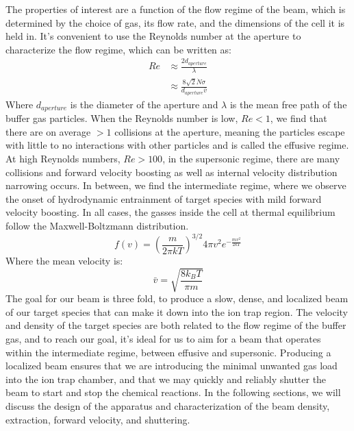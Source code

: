 The properties of interest are a function of the flow regime of the beam, which is determined by the choice of gas, its flow rate, and the dimensions of the cell it is held in. It's convenient to use the Reynolds number at the aperture to characterize the flow regime, which can be written as:
\begin{align}
	Re & \approx \frac{2 d_{aperture}}{\lambda} \nonumber \\
	& \approx \frac{8\sqrt{2} \dot{N} \sigma}{d_{aperture} \bar{v}} \label{eq: reynolds}
\end{align}
Where $d_{aperture}$ is the diameter of the aperture and $\lambda$ is the mean free path of the buffer gas particles.\cite{Hutzler2012} When the Reynolds number is low, $Re<1$, we find that there are on average $>1$ collisions at the aperture, meaning the particles escape with little to no interactions with other particles and is called the effusive regime. At high Reynolds numbers, $Re>100$, in the supersonic regime, there are many collisions and forward velocity boosting as well as internal velocity distribution narrowing occurs. In between, we find the intermediate regime, where we observe the onset of hydrodynamic entrainment of target species with mild forward velocity boosting. In all cases, the gasses inside the cell at thermal equilibrium follow the Maxwell-Boltzmann distribution.
\begin{equation}
	f(v) = \left(\frac{m}{2 \pi k T}\right)^{3/2}4 \pi v^2 e^{-\frac{m v^2}{2 k T}}
	\label{eq: mb_distribution}
\end{equation}
Where the mean velocity is:
\begin{equation}
	\bar{v} = \sqrt{\frac{8 k_B T}{\pi m}}
	\label{eq: mb_mean}
\end{equation}
The goal for our beam is three fold, to produce a slow, dense, and localized beam of our target species that can make it down into the ion trap region. The velocity and density of the target species are both related to the flow regime of the buffer gas, and to reach our goal, it's ideal for us to aim for a beam that operates within the intermediate regime, between effusive and supersonic. Producing a localized beam ensures that we are introducing the minimal unwanted gas load into the ion trap chamber, and that we may quickly and reliably shutter the beam to start and stop the chemical reactions. In the following sections, we will discuss the design of the apparatus and characterization of the beam density, extraction, forward velocity, and shuttering.